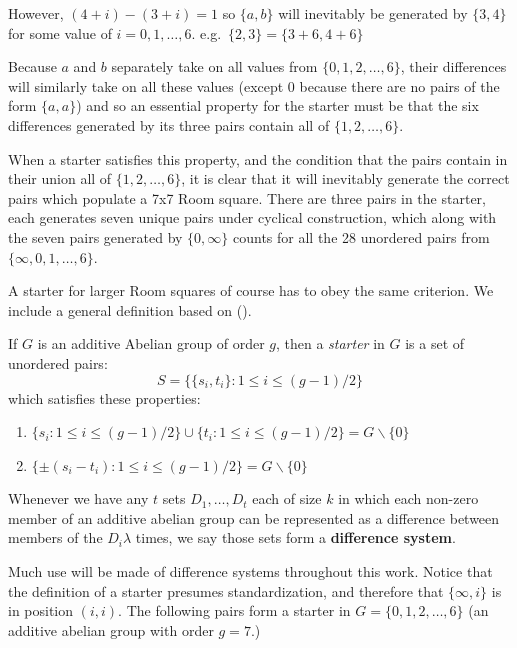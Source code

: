\documentclass[
  11pt,
  a4paper]{book}
\begin{document}
However, \((4 + i) - (3 + i) = 1\) so \(\{a, b\}\) will inevitably be
generated by \(\{3, 4\}\) for some value of \(i = 0, 1, \ldots, 6\).
e.g.~\(\{2, 3\} = \{3 + 6, 4 + 6\}\)

Because \(a\) and \(b\) separately take on all values from
\(\{0, 1, 2, \ldots, 6\}\), their differences will similarly take on
all these values (except 0 because there are no pairs of the form
\(\{a, a\}\)) and so an essential property for the starter must be
that the six differences generated by its three pairs contain all of
\(\{1, 2, \ldots, 6\}\).

When a starter satisfies this property, and the condition
that the pairs contain in their union all of
\(\{1, 2, \ldots, 6\}\), it is clear that it will inevitably generate
the correct pairs which populate a 7x7 Room square. There
are three pairs in the starter, each generates seven unique
pairs under cyclical construction, which along with the
seven pairs generated by \(\{0, \infty\}\) counts for all the
28 unordered pairs from \(\{\infty, 0, 1, \ldots, 6\}\).

A starter for larger Room squares of course has to obey the same
criterion. We include a general definition based on
(\textcite{dinitz_contemporary_1992}).

If \(G\) is an additive Abelian group of order \(g\), then a
\emph{starter} in \(G\) is a set of unordered pairs:
\[S = \{\{s_i, t_i\}:1 \leq i \leq (g - 1)/2\}\]
which satisfies these properties:

\begin{enumerate}
\def\labelenumi{\arabic{enumi}.}
\item
  \(\{s_i:1 \leq i \leq (g-1)/2\} \cup \{t_i : 1 \leq i \leq (g-1)/2\} = G \backslash \{0\}\)
\item
  \(\{\pm (s_i - t_i ) : 1 \leq i \leq (g-1)/2 \} = G \backslash \{0\}\)
\end{enumerate}

Whenever we have any \(t\) sets \(D_1, \ldots, D_t\) each of
size \(k\) in which each non-zero member of an additive
abelian group can be represented as a difference between
members of the \(D_i \lambda\) times, we say those sets form a
\textbf{difference system}.

Much use will be made of difference systems throughout this
work. Notice that the definition of a starter presumes
standardization, and therefore that \(\{\infty, i\}\) is in
position \((i, i)\). The following pairs form a starter in
\(G = \{0, 1, 2, \ldots, 6\}\) (an additive abelian group with
order \(g = 7\).)
\end{document}

